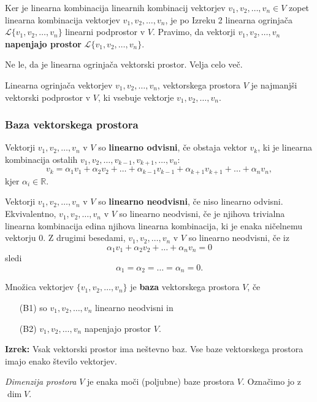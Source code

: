 \documentclass{article}
\begin{document}
\begin{multicols}{2}
Ker je linearna kombinacija linearnih kombinacij vektorjev \( v_1, v_2, \ldots, v_n \in V \) zopet linearna kombinacija vektorjev \( v_1, v_2, \ldots, v_n \), je po Izreku 2 linearna ogrinjača \( \mathcal{L}\{v_1, v_2, \ldots, v_n\} \) linearni podprostor v \( V \). Pravimo, da vektorji \( v_1, v_2, \ldots, v_n \) \textbf{napenjajo prostor} \( \mathcal{L}\{v_1, v_2, \ldots, v_n\} \).

Ne le, da je linearna ogrinjača vektorski prostor. Velja celo več.

 Linearna ogrinjača vektorjev \( v_1, v_2, \ldots, v_n \), vektorskega prostora \( V \) je najmanjši vektorski podprostor v \( V \), ki vsebuje vektorje \( v_1, v_2, \ldots, v_n \).

\subsubsection{Baza vektorskega prostora}

Vektorji \( v_1, v_2, \ldots, v_n \) v \( V \) so \textbf{linearno odvisni}, če obstaja vektor \( v_k \), ki je linearna kombinacija ostalih \( v_1, v_2, \ldots, v_{k-1}, v_{k+1}, \ldots, v_n \):
\[ v_k = \alpha_1v_1 + \alpha_2v_2 + \ldots + \alpha_{k-1}v_{k-1} + \alpha_{k+1}v_{k+1} + \ldots + \alpha_nv_n, \]
kjer \( \alpha_i \in \mathbb{R} \).

Vektorji \( v_1, v_2, \ldots, v_n \) v \( V \) so \textbf{linearno neodvisni}, če niso linearno odvisni. Ekvivalentno, \( v_1, v_2, \ldots, v_n \) v \( V \) so linearno neodvisni, če je njihova trivialna linearna kombinacija edina njihova linearna kombinacija, ki je enaka ničelnemu vektorju \( 0 \). Z drugimi besedami, \( v_1, v_2, \ldots, v_n \) v \( V \) so linearno neodvisni, če iz
\[ \alpha_1v_1 + \alpha_2v_2 + \ldots + \alpha_nv_n = 0 \]
sledi
\[ \alpha_1 = \alpha_2 = \ldots = \alpha_n = 0. \]


Množica vektorjev \( \{v_1, v_2, \ldots, v_n\} \) je \textbf{baza} vektorskega prostora \( V \), če 
\begin{enumerate}
    \item[(B1)] so \( v_1, v_2, \ldots, v_n \) linearno neodvisni in
    \item[(B2)] \( v_1, v_2, \ldots, v_n \) napenjajo prostor \( V \).
\end{enumerate}

\textbf{Izrek:} Vsak vektorski prostor ima neštevno baz. Vse baze vektorskega prostora imajo enako število vektorjev.

\emph{Dimenzija prostora} \( V \) je enaka moči (poljubne) baze prostora \( V \). Označimo jo z \(\dim V\).


\end{multicols}
\end{document}
